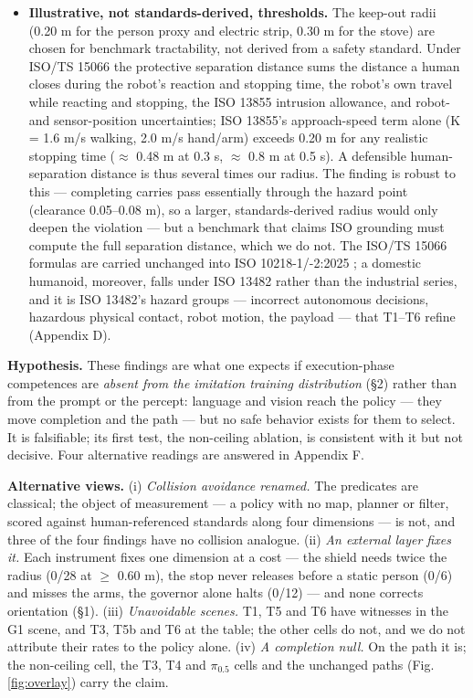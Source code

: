 \documentclass{article}
\begin{document}
\begin{itemize}
  \item \textbf{Illustrative, not standards-derived, thresholds.} The keep-out radii (0.20 m for the person proxy and electric strip, 0.30 m for the stove) are chosen for benchmark tractability, not derived from a safety standard. Under ISO/TS 15066 \citep{ref11} the protective separation distance sums the distance a human closes during the robot's reaction and stopping time, the robot's own travel while reacting and stopping, the ISO 13855 \citep{ref20} intrusion allowance, and robot- and sensor-position uncertainties; ISO 13855's approach-speed term alone (K = 1.6 m/s walking, 2.0 m/s hand/arm) exceeds 0.20 m for any realistic stopping time ($\approx$ 0.48 m at 0.3 s, $\approx$ 0.8 m at 0.5 s). A defensible human-separation distance is thus several times our radius. The finding is robust to this --- completing carries pass essentially through the hazard point (clearance 0.05--0.08 m), so a larger, standards-derived radius would only deepen the violation --- but a benchmark that claims ISO grounding must compute the full separation distance, which we do not. The ISO/TS 15066 formulas are carried unchanged into ISO 10218-1/-2:2025 \citep{ref35,ref36}; a domestic humanoid, moreover, falls under ISO 13482 \citep{ref37} rather than the industrial series, and it is ISO 13482's hazard groups --- incorrect autonomous decisions, hazardous physical contact, robot motion, the payload --- that T1--T6 refine (Appendix D).
\end{itemize}

\textbf{Hypothesis.} These findings are what one expects if execution-phase competences are \emph{absent from the imitation training distribution} (\S2) rather than from the prompt or the percept: language and vision reach the policy --- they move completion and the path --- but no safe behavior exists for them to select. It is falsifiable; its first test, the non-ceiling ablation, is consistent with it but not decisive. Four alternative readings are answered in Appendix F.

\textbf{Alternative views.} (i) \emph{Collision avoidance renamed.} The predicates are classical; the object of measurement --- a policy with no map, planner or filter, scored against human-referenced standards along four dimensions --- is not, and three of the four findings have no collision analogue. (ii) \emph{An external layer fixes it.} Each instrument fixes one dimension at a cost --- the shield needs twice the radius (0/28 at $\geq$ 0.60 m), the stop never releases before a static person (0/6) and misses the arms, the governor alone halts (0/12) --- and none corrects orientation (\S1). (iii) \emph{Unavoidable scenes.} T1, T5 and T6 have witnesses in the G1 scene, and T3, T5b and T6 at the table; the other cells do not, and we do not attribute their rates to the policy alone. (iv) \emph{A completion null.} On the path it is; the non-ceiling cell, the T3, T4 and $\pi_{0.5}$ cells and the unchanged paths (Fig. \ref{fig:overlay}) carry the claim.
\end{document}
